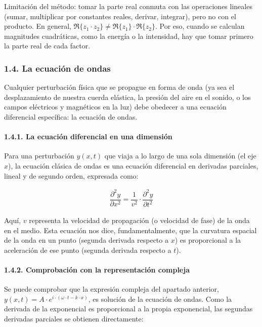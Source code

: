 \documentclass[
  spanish,
]{article}
\begin{document}
Limitación del método: tomar la parte real conmuta con las operaciones
lineales (sumar, multiplicar por constantes reales, derivar, integrar),
pero no con el producto. En general,
\(\Re\{z_1 \cdot z_2\} \neq \Re\{z_1\} \cdot \Re\{z_2\}\). Por eso,
cuando se calculan magnitudes cuadráticas, como la energía o la
intensidad, hay que tomar primero la parte real de cada factor.

\subsubsection{1.4. La ecuación de ondas}\label{la-ecuaciuxf3n-de-ondas}

Cualquier perturbación física que se propague en forma de onda (ya sea
el desplazamiento de nuestra cuerda elástica, la presión del aire en el
sonido, o los campos eléctricos y magnéticos en la luz) debe obedecer a
una ecuación diferencial específica: la ecuación de ondas.

\paragraph{1.4.1. La ecuación diferencial en una
dimensión}\label{la-ecuaciuxf3n-diferencial-en-una-dimensiuxf3n}

Para una perturbación \(y(x,t)\) que viaja a lo largo de una sola
dimensión (el eje \(x\)), la ecuación clásica de ondas es una ecuación
diferencial en derivadas parciales, lineal y de segundo orden, expresada
como:

\[
\begin{aligned}
\dfrac{\partial^2 y}{\partial x^2} = \dfrac{1}{v^2} \cdot \dfrac{\partial^2 y}{\partial t^2}
\end{aligned}
\]

Aquí, \(v\) representa la velocidad de propagación (o velocidad de fase)
de la onda en el medio. Esta ecuación nos dice, fundamentalmente, que la
curvatura espacial de la onda en un punto (segunda derivada respecto a
\(x\)) es proporcional a la aceleración de ese punto (segunda derivada
respecto a \(t\)).

\paragraph{1.4.2. Comprobación con la representación
compleja}\label{comprobaciuxf3n-con-la-representaciuxf3n-compleja}

Se puede comprobar que la expresión compleja del apartado anterior,
\(y(x,t) = A \cdot e^{i \cdot (\omega \cdot t - k \cdot x)}\), es
solución de la ecuación de ondas. Como la derivada de la exponencial es
proporcional a la propia exponencial, las segundas derivadas parciales
se obtienen directamente:
\end{document}
